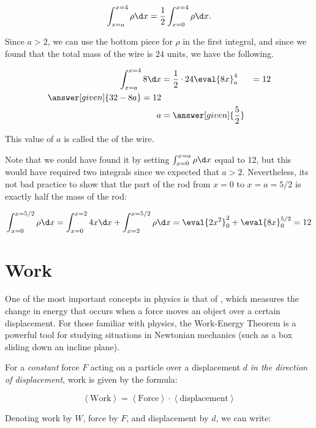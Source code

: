\documentclass{ximera}
\begin{document}
\begin{example}
\begin{explanation}
 \[
 \int_{x=a}^{x=4} \rho \d x = \frac{1}{2} \int_{x=0}^{x=4} \rho \d x. \\
 \]
 
 Since $a>2$, we can use the bottom piece for $\rho$ in the first integral, and since we found that the total mass of the wire is $24$ units, we have the following.
 
 
 \begin{align*}
  \int_{x=a}^{x=4} 8 \d x &= \frac{1}{2} \cdot 24
  \eval{8x}_a^4 &=12 \\
  \answer[given]{32-8a} = 12 \\
  a &= \answer[given]{\frac{5}{2}}
  \end{align*}
  
  \begin{remark}
  This value of $a$ is called the  of the wire.  
  
Note that we could have found it by setting $\int_{x=0}^{x=a} \rho \d x$ equal to 12, but this would have required two integrals since we expected that $a>2$.  Nevertheless, its not bad practice to show that the part of the rod from $x=0$ to $x=a=5/2$ is exactly half the mass of the rod:
  
  \[
  \int_{x=0}^{x=5/2} \rho \d x =   \int_{x=0}^{x=2} 4x \d x +  \int_{x=2}^{x=5/2} \rho \d x =\eval{2x^2}_0^2+\eval{8x}_0^{5/2} = 12
  \]

  \end{remark}
   \end{explanation}

\end{example}


\section{Work}
One of the most important concepts in physics is that of , which measures the change in energy that occurs when a force moves an object over a certain displacement.  For those familiar with physics, the Work-Energy Theorem is a powerful tool for studying situations in Newtonian mechanics (such as a box sliding down an incline plane). 

For a \emph{constant} force $F$ acting on a particle over a displacement $d$ \emph{in the direction of displacement}, work is given by the formula:

\[ \left<\textrm{Work} \right>=  \left<\textrm{Force} \right> \cdot \left<\textrm{displacement} \right> \]

Denoting work by $W$, force by $F$, and displacement by $d$, we can write:
\end{document}
